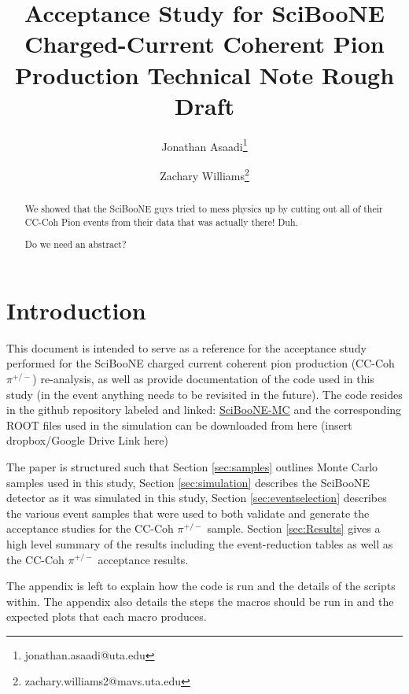 \documentclass[11pt]{article}
\title{Acceptance Study for SciBooNE Charged-Current Coherent Pion Production Technical Note Rough Draft}
\author[1]{Jonathan Asaadi\thanks{jonathan.asaadi@uta.edu}}
\author[1]{Zachary Williams\thanks{zachary.williams2@mavs.uta.edu}}
\affil[1]{Department of Physics, The University of Texas at Arlington}
\begin{document}
\begin{minipage}[h]{\textwidth}
\maketitle
\begin{abstract}
We showed that the SciBooNE guys tried to mess physics up by cutting out all of their CC-Coh Pion events from their data that was actually there! Duh.


Do we need an abstract?
\end{abstract}
\end{minipage}



\section{Introduction}\label{sec:introduction}
This document is intended to serve as a reference for the acceptance study performed for the SciBooNE charged current coherent pion production (CC-Coh $\pi^{+/-}$) re-analysis, as well as provide documentation of the code used in this study (in the event anything needs to be revisited in the future). The code resides in the github repository labeled and linked: \href{https://github.com/williamszg/SciBooNE-MC}{SciBooNE-MC} and the corresponding ROOT files used in the simulation can be downloaded from here (insert dropbox/Google Drive Link here)

The paper is structured such that Section \ref*{sec:samples} outlines Monte Carlo samples used in this study, Section \ref*{sec:simulation} describes the SciBooNE detector as it was simulated in this study, Section \ref*{sec:eventselection} describes the various event samples that were used to both validate and generate the acceptance studies for the CC-Coh $\pi^{+/-}$ sample. Section \ref*{sec:Results} gives a high level summary of the results including the event-reduction tables as well as the CC-Coh $\pi^{+/-}$ acceptance results. %

The appendix is left to explain how the code is run and the details of the scripts within. The appendix also details the steps the macros should be run in and the expected plots that each macro produces.
\end{document}
